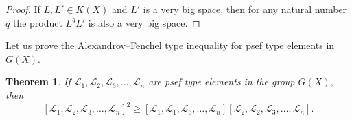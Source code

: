 \documentclass[11pt]{article}
\theoremstyle{plain}
\newtheorem{theorem}{Theorem}[section]
\theoremstyle{definition}
\begin{document}
\begin{proof} If  $L,L'\in K(X)$  and $L'$ is a very big space, then  for any natural number $q$ the product  $L^qL'$ is also  a very big space.
\end{proof}


Let us prove the Alexandrov--Fenchel type  inequality  for psef type elements in $G(X)$.

\begin{theorem}\label{strongKht} If $\mathcal L_1, \mathcal L_2, \mathcal L_3,\dots,\mathcal L_n$ are
psef type elements in the group $G(X)$, then
\begin{equation}\label{nefaf}
[\mathcal L_1, \mathcal L_2,\mathcal  L_3,\dots, \mathcal L_n]^2 \geq [\mathcal L_1, \mathcal L_1, \mathcal  L_3, \dots,\mathcal L_n] [ \mathcal L_2, \mathcal L_2,   \mathcal L_3, \dots, \mathcal  L_n].
\end{equation}
\end{theorem}
\end{document}
